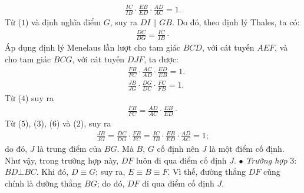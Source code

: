 \begin{multicols}{2}
	\begin{align*}
		\frac{{IC}}{{IB}} \cdot \frac{{EB}}{{ED}} \cdot \frac{{AD}}{{AC}} = 1. \tag{$2$}
	\end{align*}
	Từ ($1$) và định nghĩa điểm $G$, suy ra $DI \parallel GB$. Do đó, theo định lý Thales, ta có:
	\begin{align*}
		\frac{{DC}}{{DG}} = \frac{{IC}}{{IB}} \cdot \tag{$3$}
	\end{align*}
	Áp dụng định lý Menelaus lần lượt cho tam giác $BCD$, với cát tuyến $AEF$, và cho tam giác $BCG$, với cát tuyến $DJF$, ta được:
	\begin{align*}
		&\frac{{FB}}{{FC}} \cdot \frac{{AC}}{{AD}} \cdot \frac{{ED}}{{EB}} = 1. \tag{$4$}\\
		&\frac{{JB}}{{JG}} \cdot \frac{{DG}}{{DC}} \cdot \frac{{FC}}{{FB}} = 1.\tag{$5$}
	\end{align*}
	Từ ($4$) suy ra
	\begin{align*}
		\frac{{FB}}{{FC}} = \frac{{AD}}{{AC}} \cdot \frac{{EB}}{{ED}} \cdot \tag{$6$}
	\end{align*}
	Từ ($5$), ($3$), ($6$) và ($2$), suy ra
	\begin{align*}
		\frac{{JB}}{{JG}} = \frac{{DC}}{{DG}} \cdot \frac{{FB}}{{FC}} = \frac{{IC}}{{IB}} \cdot \frac{{EB}}{{ED}} \cdot \frac{{AD}}{{AC}} = 1;
	\end{align*}
	do đó, $J$ là trung điểm của $BG$. Mà $B$, $G$ cố định nên $J$ là một điểm cố định.
	\vskip 0.05cm
	Như vậy, trong trường hợp này, $DF$ luôn đi qua điểm cố định $J$.
	\vskip 0.05cm
	$\bullet$ \textit{Trường hợp} $3$: $BD \bot BC$.
	\vskip 0.05cm
	Khi đó, $D \equiv G$; suy ra, $E \equiv B \equiv F$. Vì thế, đường thẳng $DF$ cũng chính là đường thẳng $BG$; do đó, $DF$ đi qua điểm cố định $J$.
	\begin{figure}[H]
		\centering
		\vspace*{-5pt}
		\captionsetup{labelformat= empty, justification=centering}

\end{figure}
\end{multicols}
